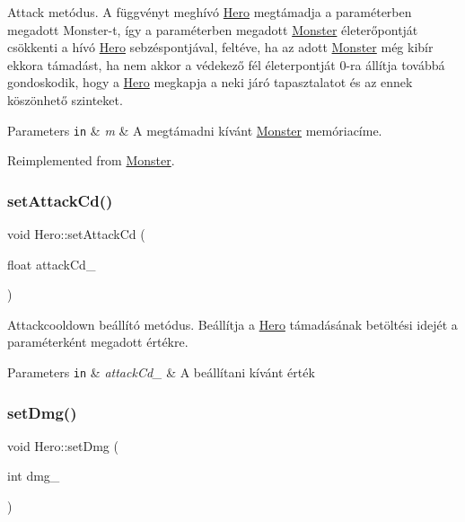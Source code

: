 Attack metódus. A függvényt meghívó \hyperlink{classHero}{Hero} megtámadja a paraméterben megadott Monster-\/t, így a paraméterben megadott \hyperlink{classMonster}{Monster} életerőpontját csökkenti a hívó \hyperlink{classHero}{Hero} sebzéspontjával, feltéve, ha az adott \hyperlink{classMonster}{Monster} még kibír ekkora támadást, ha nem akkor a védekező fél életerpontját 0-\/ra állítja továbbá gondoskodik, hogy a \hyperlink{classHero}{Hero} megkapja a neki járó tapasztalatot és az ennek köszönhető szinteket. 


\begin{DoxyParams}[1]{Parameters}
\mbox{\tt in}  & {\em m} & A megtámadni kívánt \hyperlink{classMonster}{Monster} memóriacíme. \\
\hline
\end{DoxyParams}


Reimplemented from \hyperlink{classMonster_a8de70695e71755873f1f3cc0c78ef549}{Monster}.

\mbox{\label{classHero_a1cc85148b78583aa9dbad3bc5aff140c}} 
\subsubsection{\texorpdfstring{set\+Attack\+Cd()}{setAttackCd()}}
{\footnotesize\ttfamily void Hero\+::set\+Attack\+Cd (\begin{DoxyParamCaption}\item[{float}]{attack\+Cd\+\_\+ }\end{DoxyParamCaption})}



Attackcooldown beállító metódus. Beállítja a \hyperlink{classHero}{Hero} támadásának betöltési idejét a paraméterként megadott értékre. 


\begin{DoxyParams}[1]{Parameters}
\mbox{\tt in}  & {\em attack\+Cd\+\_\+} & A beállítani kívánt érték \\
\hline
\end{DoxyParams}
\mbox{\label{classHero_a367347243a9066b06ccfc766dbac6e56}} 
\subsubsection{\texorpdfstring{set\+Dmg()}{setDmg()}}
{\footnotesize\ttfamily void Hero\+::set\+Dmg (\begin{DoxyParamCaption}\item[{int}]{dmg\+\_\+ }\end{DoxyParamCaption})}




